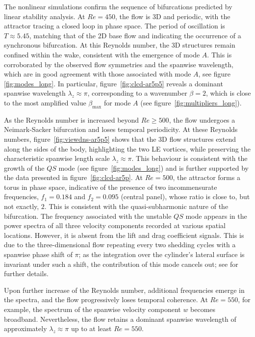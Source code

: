 The nonlinear simulations confirm the sequence of bifurcations predicted by linear stability analysis. At $Re=450$, the flow is 3D and periodic, with the attractor tracing a closed loop in phase space. The period of oscillation is $T \approx 5.45$, matching that of the 2D base flow and indicating the occurrence of a synchronous bifurcation. At this Reynolds number, the 3D structures remain confined within the wake, consistent with the emergence of mode $A$. This is corroborated by the observed flow symmetries and the spanwise wavelength, which are in good agreement with those associated with mode $A$, see figure \ref{fig:modes_long}. In particular, figure~\ref{fig:clcd-ar5p5} reveals a dominant spanwise wavelength $\lambda_z \approx \pi$, corresponding to a wavenumber $\beta = 2$, which is close to the most amplified value $\beta_\text{max}$ for mode $A$ (see figure~\ref{fig:multipliers_long}).

As the Reynolds number is increased beyond $Re \ge 500$, the flow undergoes a Neimark-Sacker bifurcation and loses temporal periodicity. At these Reynolds numbers, figure~\ref{fig:viewdns-ar5p5} shows that the 3D flow structures extend along the sides of the body, highlighting the two LE vortices, while preserving the characteristic spanwise length scale $\lambda_z \approx \pi$. This behaviour is consistent with the growth of the $QS$ mode (see figure~\ref{fig:modes_long}) and is further supported by the data presented in figure~\ref{fig:clcd-ar5p}. At $Re = 500$, the attractor forms a torus in phase space, indicative of the presence of two incommensurate frequencies, $f_1 = 0.184$ and $f_2 = 0.095$ (central panel), whose ratio is close to, but not exactly, $2$. This is consistent with the quasi-subharmonic nature of the bifurcation. The frequency associated with the unstable $QS$ mode appears in the power spectra of all three velocity components recorded at various spatial locations. However, it is absent from the lift and drag coefficient signals. This is due to the three-dimensional flow repeating every two shedding cycles with a spanwise phase shift of $\pi$; as the integration over the cylinder's lateral surface is invariant under such a shift, the contribution of this mode cancels out; see \cite{chiarini-quadrio-auteri-2022d} for further details.

Upon further increase of the Reynolds number, additional frequencies emerge in the spectra, and the flow progressively loses temporal coherence. At $Re = 550$, for example, the spectrum of the spanwise velocity component $w$ becomes broadband. Nevertheless, the flow retains a dominant spanwise wavelength of approximately $\lambda_z \approx \pi$ up to at least $Re = 550$.

